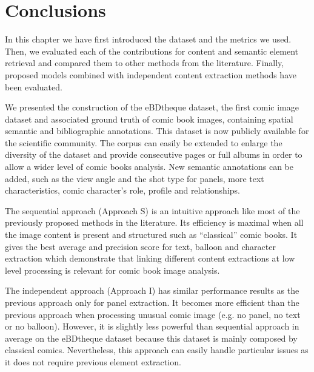 

\section{Conclusions}
\label{sub:ex:conclusion}

In this chapter we have first introduced the dataset and the metrics we used.
Then, we evaluated each of the contributions for content and semantic element retrieval and compared them to other methods from the literature.
Finally, proposed models combined with independent content extraction methods have been evaluated.

We presented the construction of the eBDtheque dataset, the first comic image dataset and associated ground truth of comic book images, containing spatial semantic and bibliographic annotations.
This dataset is now publicly available for the scientific community.
The corpus can easily be extended to enlarge the diversity of the dataset and provide consecutive pages or full albums in order to allow a wider level of comic books analysis.
New semantic annotations can be added, such as the view angle and the shot type for panels, more text characteristics, comic character's role, profile and relationships. 

The sequential approach (Approach S) is an intuitive approach like most of the previously proposed methods in the literature.
Its efficiency is maximal when all the image content is present and structured such as ``classical'' comic books.
It gives the best average and precision score for text, balloon and character extraction which demonstrate that linking different content extractions at low level processing is relevant for comic book image analysis.

The independent approach (Approach I) has similar performance results as the previous approach only for panel extraction.
It becomes more efficient than the previous approach when processing unusual comic image (e.g. no panel, no text or no balloon).
However, it is slightly less powerful than sequential approach in average on the eBDtheque dataset because this dataset is mainly composed by classical comics.
Nevertheless, this approach can easily handle particular issues as it does not require previous element extraction.

